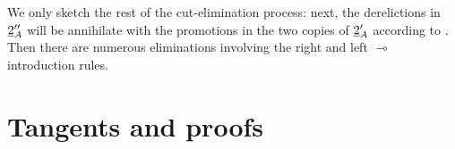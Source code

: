 \documentclass[english,letter paper,12pt,reqno]{article}
\DeclarePairedDelimiter\ket{\lvert}{\rangle}
\theoremstyle{example}
\newtheorem{definition}[theorem]{Definition}
\numberwithin{equation}{section}
\begin{document}
We only sketch the rest of the cut-elimination process: next, the derelictions in $\underline{2}_A''$ will be annihilate with the promotions in the two copies of $\underline{2}_A'$ according to \cite[\S 3.9.1]{mellies}. Then there are numerous eliminations involving the right and left $\multimap$ introduction rules. %

\section{Tangents and proofs}\label{section:example_lifting}




\end{document}

